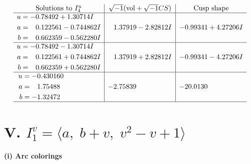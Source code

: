 \documentclass[1p]{elsarticle_modified}
\theoremstyle{definition}
\newcommand{\I}{\sqrt{-1}}
\begin{document}
$$\begin{array}{c|c|c}  
\text{Solutions to }I^u_{4}& \I (\text{vol} + \sqrt{-1}CS) & \text{Cusp shape}\\
 \hline 
\begin{aligned}
u &= -0.78492 + 1.30714 I \\
a &= \phantom{-}0.122561 - 0.744862 I \\
b &= \phantom{-}0.662359 - 0.562280 I\end{aligned}
 & \phantom{-}1.37919 - 2.82812 I & -0.99341 + 4.27206 I \\ \hline\begin{aligned}
u &= -0.78492 - 1.30714 I \\
a &= \phantom{-}0.122561 + 0.744862 I \\
b &= \phantom{-}0.662359 + 0.562280 I\end{aligned}
 & \phantom{-}1.37919 + 2.82812 I & -0.99341 - 4.27206 I \\ \hline\begin{aligned}
u &= -0.430160\phantom{ +0.000000I} \\
a &= \phantom{-}1.75488\phantom{ +0.000000I} \\
b &= -1.32472\phantom{ +0.000000I}\end{aligned}
 & -2.75839\phantom{ +0.000000I} & -20.0130\phantom{ +0.000000I}\\
 \hline 
 \end{array}$$\newpage\newpage\renewcommand{\arraystretch}{1}
\centering \section*{V. $I^v_{1}= \langle a,\;b+v,\;v^2- v+1 \rangle$}
\flushleft \textbf{(i) Arc colorings}\\
\end{document}
